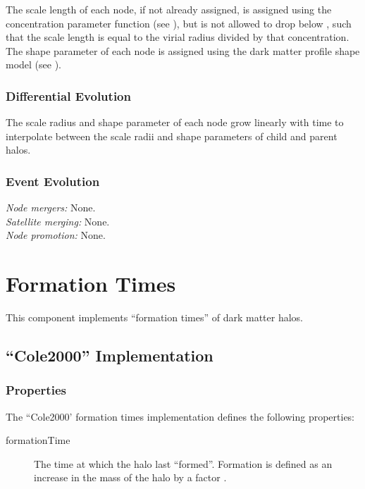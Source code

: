 The scale length of each node, if not already assigned, is assigned using the concentration parameter function (see ), but is not allowed to drop below {\normalfont \ttfamily [darkMatterProfileMinimumConcentration]}, such that the scale length is equal to the virial radius divided by that concentration. The shape parameter of each \gls{node} is assigned using the dark matter profile shape model (see ).

\subsubsection{Differential Evolution}

The scale radius and shape parameter of each node grow linearly with time to interpolate between the scale radii and shape parameters of child and parent halos.

\subsubsection{Event Evolution}

\noindent\emph{Node mergers:} None.\\

\noindent\emph{Satellite merging:} None.\\

\noindent\emph{Node promotion:} None.\\

\section{Formation Times}\label{sec:ComponentFormationTimes}

This \gls{component} implements ``formation times'' of dark matter halos.

\subsection{``Cole2000'' Implementation}

\subsubsection{Properties}

The ``Cole2000' formation times implementation defines the following properties:
\begin{description}
 \item [{\normalfont \ttfamily formationTime}] The time at which the halo last ``formed''. Formation is defined as an increase in the mass of the halo by a factor {\normalfont \ttfamily [haloReformationMassFactor]}.
\end{description}

